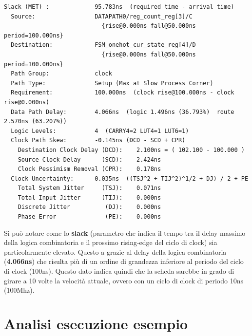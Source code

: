 \documentclass[a4paper]{report}
\begin{document}
\begin{verbatim}
Slack (MET) :             95.783ns  (required time - arrival time)
  Source:                 DATAPATH0/reg_count_reg[3]/C
                            {rise@0.000ns fall@50.000ns period=100.000ns}
  Destination:            FSM_onehot_cur_state_reg[4]/D
                            {rise@0.000ns fall@50.000ns period=100.000ns}
  Path Group:             clock
  Path Type:              Setup (Max at Slow Process Corner)
  Requirement:            100.000ns  (clock rise@100.000ns - clock rise@0.000ns)
  Data Path Delay:        4.066ns  (logic 1.496ns (36.793%)  route 2.570ns (63.207%))
  Logic Levels:           4  (CARRY4=2 LUT4=1 LUT6=1)
  Clock Path Skew:        -0.145ns (DCD - SCD + CPR)
    Destination Clock Delay (DCD):    2.100ns = ( 102.100 - 100.000 ) 
    Source Clock Delay      (SCD):    2.424ns
    Clock Pessimism Removal (CPR):    0.178ns
  Clock Uncertainty:      0.035ns  ((TSJ^2 + TIJ^2)^1/2 + DJ) / 2 + PE
    Total System Jitter     (TSJ):    0.071ns
    Total Input Jitter      (TIJ):    0.000ns
    Discrete Jitter          (DJ):    0.000ns
    Phase Error              (PE):    0.000ns
\end{verbatim}

Si può notare come lo \textbf{slack} (parametro che indica il tempo tra il delay massimo della logica combinatoria e il prossimo rising-edge del ciclo di clock) sia particolarmente elevato. Questo a grazie al delay della logica combinatoria (\textbf{4.066ns}) che risulta più di un ordine di grandezza inferiore al periodo del ciclo di clock (100ns).
Questo dato indica quindi che la scheda sarebbe in grado di girare a 10 volte la velocità attuale, ovvero con un ciclo di clock di periodo 10ns (100Mhz).

\newpage
\section{Analisi esecuzione esempio}
\end{document}
